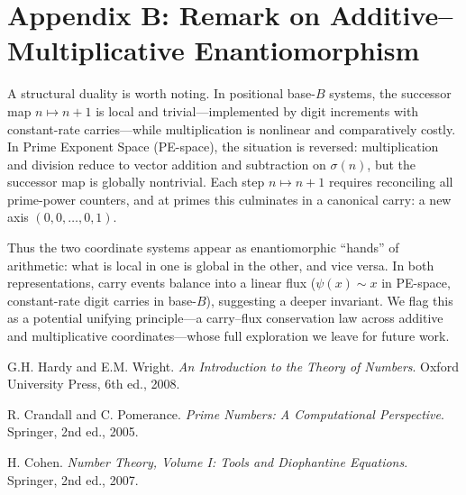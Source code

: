 \documentclass[12pt]{article}
\theoremstyle{definition}
\theoremstyle{remark}
\begin{document}
\section*{Appendix B: Remark on Additive–Multiplicative Enantiomorphism}

A structural duality is worth noting. In positional base-$B$ systems,
the successor map $n \mapsto n+1$ is local and trivial—implemented by
digit increments with constant-rate carries—while multiplication is
nonlinear and comparatively costly. In Prime Exponent Space (PE-space),
the situation is reversed: multiplication and division reduce to vector
addition and subtraction on $\sigma(n)$, but the successor map is
globally nontrivial. Each step $n \mapsto n+1$ requires reconciling all
prime-power counters, and at primes this culminates in a canonical carry:
a new axis $(0,0,\dots,0,1)$.

Thus the two coordinate systems appear as enantiomorphic “hands” of
arithmetic: what is local in one is global in the other, and vice versa.
In both representations, carry events balance into a linear flux
($\psi(x) \sim x$ in PE-space, constant-rate digit carries in base-$B$),
suggesting a deeper invariant. We flag this as a potential unifying
principle—a carry–flux conservation law across additive and
multiplicative coordinates—whose full exploration we leave for future
work.


\begin{thebibliography}{9}

G.H. Hardy and E.M. Wright. \textit{An Introduction to the Theory of Numbers}. Oxford University Press, 6th ed., 2008.

R. Crandall and C. Pomerance. \textit{Prime Numbers: A Computational Perspective}. Springer, 2nd ed., 2005.

H. Cohen. \textit{Number Theory, Volume I: Tools and Diophantine Equations}. Springer, 2nd ed., 2007.

\end{thebibliography}
\end{document}
